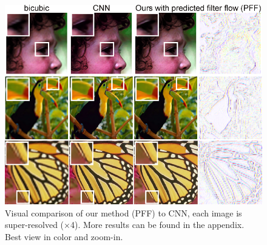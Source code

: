 \documentclass[10pt,twocolumn,letterpaper]{article}
\begin{document}
\begin{figure}[t]
    \centering
    \begin{minipage}{0.497\textwidth}
        \centering
        \includegraphics[width=1\linewidth]{demo_SISR.png}
    \end{minipage}
    \vspace{-1mm}
    \caption{Visual comparison of our method (PFF) to CNN, each image is super-resolved
    ($\times$4).  More results can be found in the appendix.
        Best view in color and zoom-in.}
    \label{fig:demo_SISR}
    \vspace{-3mm}
\end{figure}
\end{document}

